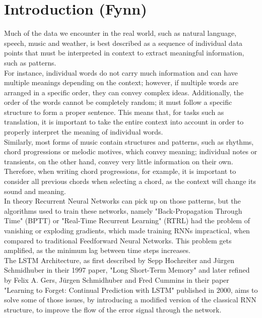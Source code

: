 \documentclass[twoside,a4paper,10pt,DIV=12,BCOR=12mm]{scrartcl}
\begin{document}


\begin{abstract}

\end{abstract}

\tableofcontents
\newpage

\section{Introduction (Fynn)}
Much of the data we encounter in the real world, such as natural language, speech, music and weather, is best described as a sequence of individual data points that must be interpreted in context to extract meaningful information, such as patterns.\\
For instance, individual words do not carry much information and can have multiple meanings depending on the context; however, if multiple words are arranged in a specific order, they can convey complex ideas. Additionally, the order of the words cannot be completely random; it must follow a specific structure to form a proper sentence. This means that, for tasks such as translation, it is important to take the entire context into account in order to properly interpret the meaning of individual words.\cite{harris1954languagestructure}\\
Similarly, most forms of music contain structures and patterns, such as rhythms, chord progressions or melodic motives, which convey meaning; individual notes or transients, on the other hand, convey very little information on their own. Therefore, when writing chord progressions, for example, it is important to consider all previous chords when selecting a chord, as the context will change its sound and meaning.\cite{eck2002musicgeneration}\\
In theory Recurrent Neural Networks can pick up on those patterns, but the algorithms used to train these networks, namely "Back-Propagation Through Time" (BPTT) or "Real-Time Recurrent Learning" (RTRL) had the problem of vanishing or exploding gradients, which made training RNNs impractical, when compared to traditional Feedforward Neural Networks. This problem gets amplified, as the minimum lag between time steps increases.\cite{hochreiter1997lstm,werb1990bptt}\\
The LSTM Architecture, as first described by Sepp Hochreiter and Jürgen Schmidhuber in their 1997 paper, "Long Short-Term Memory" and later refined by Felix A. Gers, Jürgen Schmidhuber and Fred Cummins in their paper "Learning to Forget: Continual Prediction with LSTM" published in 2000, aims to solve some of those issues, by introducing a modified version of the classical RNN structure, to improve the flow of the error signal through the network.\cite{hochreiter1997lstm}\\
\end{document}
